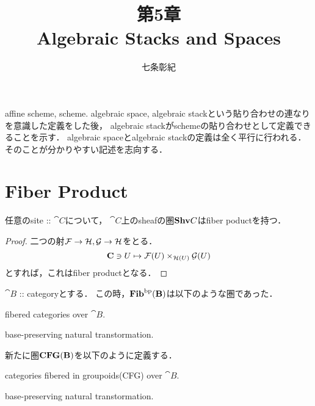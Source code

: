 

\newcommand{\Diag}{\Delta}
\newcommand{\rest}{\vspace{5pt}}
\newcommand{\rep}{{\color{blue}\#}}
\newcommand{\arpb}{\ar[lu, phantom, "\text{p.b.}"]}
\newcommand{\Isom}{\cat{Isom}}


\title{第5章 \\ Algebraic Stacks and Spaces}
\author{七条彰紀}
\maketitle
\tableofcontents
\vspace{10pt}

affine scheme, scheme. algebraic space, algebraic stackという貼り合わせの連なりを意識した定義をした後，
algebraic stackがschemeの貼り合わせとして定義できることを示す．
algebraic spaceとalgebraic stackの定義は全く平行に行われる．
そのことが分かりやすい記述を志向する．

\section{Fiber Product}
\begin{Prop}
    任意のsite :: $\cat{C}$について，
    $\cat{C}$上のsheafの圏$\mathbf{Shv}{C}$はfiber poductを持つ．
\end{Prop}
\begin{proof}
    二つの射$\mathcal{F} \to \mathcal{H}, \mathcal{G} \to \mathcal{H}$をとる．
    \[ \mathbf{C} \ni U \mapsto \mathcal{F}(U) \times_{\mathcal{H}(U)} \mathcal{G}(U) \]
    とすれば，これはfiber productとなる．
\end{proof}

$\cat{B}$ :: categoryとする．
この時，$\mathbf{Fib}^{\mathrm{bp}}(\mathbf{B})$は以下のような圏であった．
\begin{description}[labelindent=1cm]
    \item[Objects:] fibered categories over $\cat{B}$.
    \item[Arrows:]  base-preserving natural transtormation.
\end{description}
新たに圏$\mathbf{CFG}(\mathbf{B})$を以下のように定義する．
\begin{description}[labelindent=1cm]
    \item[Objects:] categories fibered in groupoids(CFG) over $\cat{B}$.
    \item[Arrows:] base-preserving natural transtormation.
\end{description}

